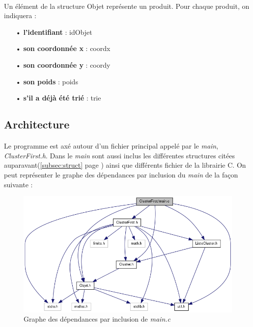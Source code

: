 \documentclass[twoside,UTF8]{EPURapport}
\begin{document}
\paragraph{}
Un élément de la structure Objet représente un produit. Pour chaque produit, on indiquera : 
\begin{itemize}
\item[•]\textbf{l'identifiant} : idObjet
\item[•]\textbf{son coordonnée x} : coordx
\item[•]\textbf{son coordonnée y} : coordy 
\item[•]\textbf{son poids} : poids
\item[•]\textbf{s'il a déjà été trié} : trie
\end{itemize}


\subsection{Architecture}

\paragraph{}
Le programme est axé autour d'un fichier principal appelé par le \textit{main}, \textit{ClusterFirst.h}. Dans le \textit{main} sont aussi inclus les différentes structures citées auparavant(\ref{subsec:struct} page \pageref{subsec:struct}) ainsi que différents fichier de la librairie C. 
On peut représenter le graphe des dépendances par inclusion du \textit{main} de la façon suivante : 

\begin{figure}[!h]
	\center
	\includegraphics[scale=0.5]{images/main_inclusion.png}
	\caption{Graphe des dépendances par inclusion de \textit{main.c}}
\end{figure} 
\end{document}
